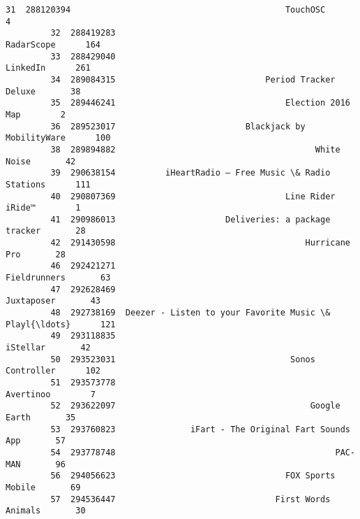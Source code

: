 \documentclass[11pt]{article}
\begin{document}
\begin{Verbatim}[commandchars=\\\{\}]
         31  288120394                                           TouchOSC        4   
         32  288419283                                         RadarScope      164   
         33  288429040                                           LinkedIn      261   
         34  289084315                              Period Tracker Deluxe       38   
         35  289446241                                  Election 2016 Map        2   
         36  289523017                          Blackjack by MobilityWare      100   
         38  289894882                                        White Noise       42   
         39  290638154          iHeartRadio – Free Music \& Radio Stations      111   
         40  290807369                                  Line Rider iRide™        1   
         41  290986013                      Deliveries: a package tracker       28   
         42  291430598                                      Hurricane Pro       28   
         46  292421271                                       Fieldrunners       63   
         47  292628469                                         Juxtaposer       43   
         48  292738169  Deezer - Listen to your Favorite Music \& Playl{\ldots}      121   
         49  293118835                                           iStellar       42   
         50  293523031                                   Sonos Controller      102   
         51  293573778                                          Avertinoo        7   
         52  293622097                                       Google Earth       35   
         53  293760823               iFart - The Original Fart Sounds App       57   
         54  293778748                                            PAC-MAN       96   
         56  294056623                                  FOX Sports Mobile       69   
         57  294536447                                First Words Animals       30   
         

\end{Verbatim}
\end{document}
